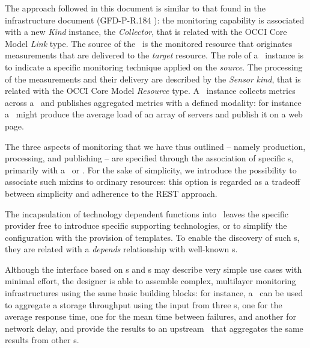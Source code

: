 \documentclass[10pt]{article}  %
\begin{document}
The approach followed in this document is similar to that found in the infrastructure document (GFD-P-R.184 \cite{occi:infr}): the monitoring capability is associated with a new {\em Kind} instance, the {\em Collector}, that is related with the OCCI Core Model {\em Link} type. The source of the \coll\ is the monitored resource that originates measurements that are delivered to the {\em target} resource. The role of a \coll\ instance is to indicate a specific monitoring technique applied on the {\em source}. The processing of the measurements and their delivery are described by the {\em Sensor} {\em kind}, that is related with the OCCI Core Model {\em Resource} type. A \sens\ instance collects metrics across a \coll\ and publishes aggregated metrics with a defined modality: for instance a \sens\ might produce the average load of an array of servers and publish it on a web page.

The three aspects of monitoring that we have thus outlined -- namely production, processing, and publishing -- are specified through the association of specific \mi s, primarily with a \sens\ or \coll. For the sake of simplicity, we introduce the possibility to associate such mixins to ordinary resources: this option is regarded as a tradeoff between simplicity and adherence to the REST approach.

The incapsulation of technology dependent functions into \mi\ leaves the specific provider free to introduce specific supporting technologies, or to simplify the configuration with the provision of templates. To enable the discovery of such \mi s, they are related with a {\em depends} relationship with well-known \mi s.



Although the interface based on \sens s and \coll s may describe very simple use cases with minimal effort, the designer is able to assemble complex, multilayer monitoring infrastructures using the same basic building blocks: for instance, a \sens\ can be used to aggregate a storage throughput using the input from three \coll s, one for the average response time, one for the mean time between failures, and another for network delay, and provide the results to an upstream \sens\ that aggregates the same results from other \sens s.
\end{document}
